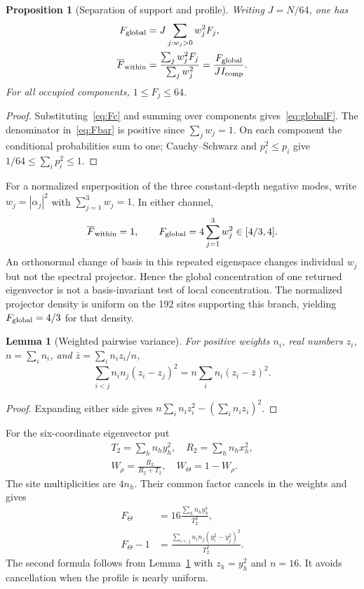 \documentclass[journal,a4paper,10pt]{IEEEtran}
\newtheorem{lemma}[theorem]{Lemma}
\newtheorem{proposition}[theorem]{Proposition}
\theoremstyle{definition}\newtheorem{definition}[theorem]{Definition}
\theoremstyle{remark}\newtheorem{remark}[theorem]{Remark}
\begin{document}
\begin{proposition}[Separation of support and profile]\label{prop:concentration}
Writing $J=N/64$, one has
\begin{align}
F_{\rm global}&=J\sum_{j:w_j>0}w_j^2F_j,\label{eq:globalF}\\
\overline F_{\rm within}&=
\frac{\sum_jw_j^2F_j}{\sum_jw_j^2}
=\frac{F_{\rm global}}{J I_{\rm comp}}.\label{eq:Fbar}
\end{align}
For all occupied components, $1\leq F_j\leq64$.
\end{proposition}
\begin{proof}
Substituting~\eqref{eq:Fc} and summing over components gives~\eqref{eq:globalF}. The denominator in~\eqref{eq:Fbar} is positive since $\sum_jw_j=1$. On each component the conditional probabilities sum to one; Cauchy--Schwarz and $p_i^2\leq p_i$ give $1/64\leq\sum_ip_i^2\leq1$.
\end{proof}
For a normalized superposition of the three constant-depth negative modes, write $w_j=|\alpha_j|^2$ with $\sum_{j=1}^3w_j=1$. In either channel,
\begin{equation}
\overline F_{\rm within}=1,\qquad
F_{\rm global}=4\sum_{j=1}^3w_j^2\in[4/3,4].
\end{equation}
An orthonormal change of basis in this repeated eigenspace changes individual $w_j$ but not the spectral projector. Hence the global concentration of one returned eigenvector is not a basis-invariant test of local concentration. The normalized projector density is uniform on the 192 sites supporting this branch, yielding $F_{\rm global}=4/3$ for that density.

\begin{lemma}[Weighted pairwise variance]\label{lem:variance}
For positive weights $n_i$, real numbers $z_i$, $n=\sum_i n_i$, and $\bar z=\sum_i n_i z_i/n$,
\begin{equation}\label{eq:pairwise}
\sum_{i<j}n_i n_j(z_i-z_j)^2
=n\sum_i n_i(z_i-\bar z)^2.
\end{equation}
\end{lemma}
\begin{proof}
Expanding either side gives $n\sum_i n_i z_i^2-(\sum_i n_i z_i)^2$.
\end{proof}
For the six-coordinate eigenvector put
\begin{equation}
\begin{gathered}
T_2=\sum_h n_h y_h^2,\quad R_2=\sum_h n_h x_h^2,\\
W_\rho=\frac{R_2}{R_2+T_2},\quad W_\Theta=1-W_\rho.
\end{gathered}
\end{equation}
The site multiplicities are $4n_h$. Their common factor cancels in the weights and gives
\begin{align}\label{eq:Fexcess}
F_\Theta&=16\frac{\sum_h n_h y_h^4}{T_2^2},\nonumber\\
F_\Theta-1&=\frac{\sum_{i<j}n_i n_j(y_i^2-y_j^2)^2}{T_2^2}.
\end{align}
The second formula follows from Lemma~\ref{lem:variance} with $z_h=y_h^2$ and $n=16$. It avoids cancellation when the profile is nearly uniform.
\end{document}
